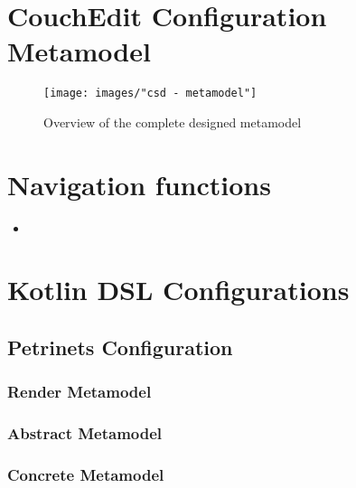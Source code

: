 \chapter{CouchEdit Configuration Metamodel}
\begin{sidewaysfigure}
\centering
\texttt{[image: images/"csd - metamodel"]}
\caption{Overview of the complete designed metamodel}
\label{fig:complete-metamodel}
\end{sidewaysfigure}

\chapter{Navigation functions}
\label{app:navigationfunctions}
\begin{itemize}
  \item {}
\end{itemize}


\chapter{Kotlin DSL Configurations}
\section{Petrinets Configuration}
\label{app:petri}
\subsection*{Render Metamodel}

\subsection*{Abstract Metamodel}

\subsection*{Concrete Metamodel}
\raggedbottom



